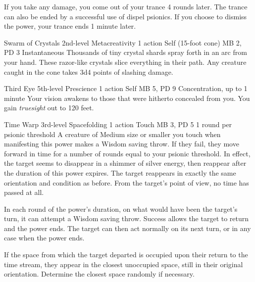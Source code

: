   If you take any damage,
  you come out of your trance 4 rounds later.
  The trance can also be ended by a
  successful use of dispel psionics.
  If you choose to dismiss the power,
  your trance ends 1 minute later.

\DndPowerHeader%
  {Swarm of Crystals}
  {2nd-level Metacreativity}
  {1 action}
  {Self (15-foot cone)}
  {MB 2, PD 3}
  {Instantaneous}
  Thousands of tiny crystal shards spray forth in an arc from your hand.
  These razor-like crystals slice everything in their path.
  Any creature caught in the cone takes 3d4 points of slashing damage.

\DndPowerHeader%
  {Third Eye}
  {5th-level Prescience}
  {1 action}
  {Self}
  {MB 5, PD 9}
  {Concentration, up to 1 minute}
Your vision awakens to those that were hitherto
concealed from you.
You gain \emph{truesight} out to 120 feet.

\DndPowerHeader%
  {Time Warp}
  {3rd-level Spacefolding}
  {1 action}
  {Touch}
  {MB 3, PD 5}
  {1 round per psionic threshold}
  A creature of Medium size or smaller
  you touch when manifesting this power makes a Wisdom saving throw.
  If they fail, they move forward in time for a number of rounds
  equal to your psionic threshold.
  In effect, the target seems to disappear in a shimmer
  of silver energy,
  then reappear after the duration of this power expires.
  The target reappears in exactly the same
  orientation and condition as before.
  From the target's point of view,
  no time has passed at all.

  In each round of the power's duration,
  on what would have been the target's turn,
  it can attempt a Wisdom saving throw.
  Success allows the target to return and the power ends.
  The target can then act normally on its next turn,
  or in any case when the power ends.
  
  If the space from which the target departed is occupied
  upon their return to the time stream,
  they appear in the closest unoccupied space,
  still in their original orientation.
  Determine the closest space randomly if necessary.

